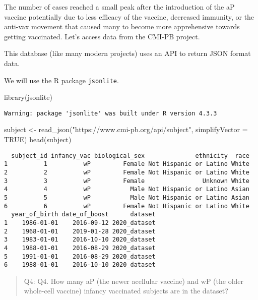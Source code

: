 \documentclass[
  letterpaper,
  DIV=11,
  numbers=noendperiod]{scrartcl}
\newenvironment{Shaded}{\begin{snugshade}}{\end{snugshade}}
\newcommand{\AttributeTok}[1]{\textcolor[rgb]{0.40,0.45,0.13}{#1}}
\newcommand{\ConstantTok}[1]{\textcolor[rgb]{0.56,0.35,0.01}{#1}}
\newcommand{\FunctionTok}[1]{\textcolor[rgb]{0.28,0.35,0.67}{#1}}
\newcommand{\NormalTok}[1]{\textcolor[rgb]{0.00,0.23,0.31}{#1}}
\newcommand{\OtherTok}[1]{\textcolor[rgb]{0.00,0.23,0.31}{#1}}
\newcommand{\StringTok}[1]{\textcolor[rgb]{0.13,0.47,0.30}{#1}}
\begin{document}
The number of cases reached a small peak after the introduction of the
aP vaccine potentially due to less efficacy of the vaccine, decreased
immunity, or the anti-vax movement that caused many to become more
apprehensive towards getting vaccinated. Let's access data from the
CMI-PB project.

This database (like many modern projects) uses an API to return JSON
format data.

We will use the R package \texttt{jsonlite}.

\begin{Shaded}
\begin{Highlighting}[]
\FunctionTok{library}\NormalTok{(jsonlite)}
\end{Highlighting}
\end{Shaded}

\begin{verbatim}
Warning: package 'jsonlite' was built under R version 4.3.3
\end{verbatim}

\begin{Shaded}
\begin{Highlighting}[]
\NormalTok{subject }\OtherTok{\textless{}{-}} \FunctionTok{read\_json}\NormalTok{(}\StringTok{"https://www.cmi{-}pb.org/api/subject"}\NormalTok{, }\AttributeTok{simplifyVector =} \ConstantTok{TRUE}\NormalTok{) }
\FunctionTok{head}\NormalTok{(subject)}
\end{Highlighting}
\end{Shaded}

\begin{verbatim}
  subject_id infancy_vac biological_sex              ethnicity  race
1          1          wP         Female Not Hispanic or Latino White
2          2          wP         Female Not Hispanic or Latino White
3          3          wP         Female                Unknown White
4          4          wP           Male Not Hispanic or Latino Asian
5          5          wP           Male Not Hispanic or Latino Asian
6          6          wP         Female Not Hispanic or Latino White
  year_of_birth date_of_boost      dataset
1    1986-01-01    2016-09-12 2020_dataset
2    1968-01-01    2019-01-28 2020_dataset
3    1983-01-01    2016-10-10 2020_dataset
4    1988-01-01    2016-08-29 2020_dataset
5    1991-01-01    2016-08-29 2020_dataset
6    1988-01-01    2016-10-10 2020_dataset
\end{verbatim}

\begin{quote}
Q4: Q4. How many aP (the newer acellular vaccine) and wP (the older
whole-cell vaccine) infancy vaccinated subjects are in the dataset?
\end{quote}
\end{document}
